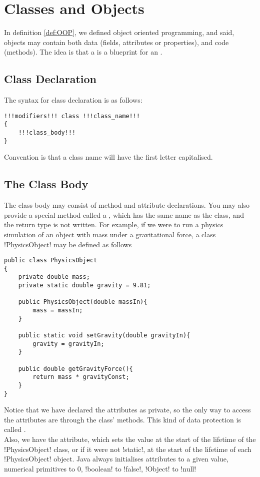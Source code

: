 \documentclass[11pt]{article}
\begin{document}
\section{Classes and Objects}
\label{sec:classesAndObjects}
In definition \ref{def:OOP}, we defined object oriented programming, and said, objects may contain both data (fields, attributes or properties), and code (methods). The idea is that a  is a blueprint for an . 
\subsection{Class Declaration}
The syntax for class declaration is as follows:
\vspace{-15pt}
\begin{lstlisting}[style=javaSyntax]
!!!modifiers!!! class !!!class_name!!!
{
    !!!class_body!!!
}
\end{lstlisting}
Convention is that a class name will have the first letter capitalised.
\subsection{The Class Body}
The class body may consist of method and attribute declarations. You may also provide a special method called a , which has the same name as the class, and the return type is not written. For example, if we were to run a physics simulation of an object with mass under a gravitational force, a class \inlineJava!PhysicsObject! may be defined as follows
\begin{lstlisting}[caption=PhysicsObject, label=lst:PhysicsObject]
public class PhysicsObject
{
    private double mass;
    private static double gravity = 9.81;

    public PhysicsObject(double massIn){
        mass = massIn;
    }

    public static void setGravity(double gravityIn){
        gravity = gravityIn;
    }

    public double getGravityForce(){
        return mass * gravityConst;
    }   
}
\end{lstlisting}
Notice that we have declared the attributes as private, so the only way to access the attributes are through the class' methods. This kind of data protection is called . \\ Also, we have  the  attribute, which sets the value at the start of the lifetime of the \inlineJava!PhysicsObject! class, or if it were not \inlineJava!static!, at the start of the lifetime of each \inlineJava!PhysicsObject! object. Java always initialises attributes to a given value, numerical primitives to 0, \inlineJava!boolean! to \inlineJava!false!, \inlineJava!Object! to \inlineJava!null!
\end{document}
